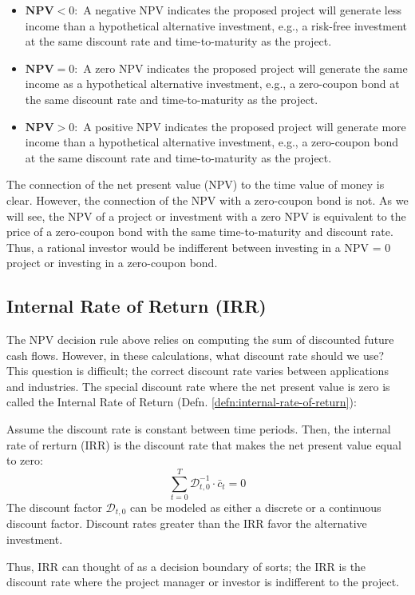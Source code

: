 \documentclass[11pt]{article}
\theoremstyle{definition}
\begin{document}
\begin{itemize}[leftmargin=*]
\item{$\textbf{NPV}<0$:~}{A negative NPV indicates the proposed project will generate less income than a hypothetical alternative investment, e.g., a risk-free investment at the same discount rate and time-to-maturity as the project.}
\item{$\textbf{NPV}=0$:~}{A zero NPV indicates the proposed project will generate the same income as a hypothetical alternative investment, e.g., a zero-coupon bond at the same discount rate and time-to-maturity as the project. }
\item{$\textbf{NPV}>0$:~}{A positive NPV indicates the proposed project will generate more income than a hypothetical alternative investment, e.g., a zero-coupon bond at the same discount rate and time-to-maturity as the project.}
\end{itemize}
The connection of the net present value (NPV) to the time value of money is clear.
However, the connection of the NPV with a zero-coupon bond is not. 
As we will see, the NPV of a project or investment with a zero NPV is equivalent to the price of a zero-coupon bond with the same time-to-maturity 
and discount rate. Thus, a rational investor would be indifferent between investing in a NPV = 0 project or investing in a zero-coupon bond.

\subsection{Internal Rate of Return (IRR)}
The NPV decision rule above relies on computing the sum of discounted future cash flows. 
However, in these calculations, what discount rate should we use? This question is difficult; the correct discount rate varies between applications and industries.  
The special discount rate where the net present value is zero is called the Internal Rate of Return (Defn. \ref{defn:internal-rate-of-return}):

\begin{definition}\label{defn:internal-rate-of-return}
Assume the discount rate is constant between time periods. Then, the internal rate of rerturn (IRR) is the discount rate that makes the net present value equal to zero:
\begin{equation}\label{eq:internal-rate-of-return}
\sum_{t=0}^{T}{\mathcal{D}_{t,0}^{-1}}\cdot\bar{c}_{t} = 0
\end{equation}
The discount factor $\mathcal{D}_{t,0}$ can be modeled as either a discrete or a continuous discount factor. Discount rates greater than the IRR favor the alternative investment.
\end{definition}
Thus, IRR can thought of as a decision boundary of sorts; the IRR is the discount rate where the project manager or investor is indifferent to the project.
\end{document}
